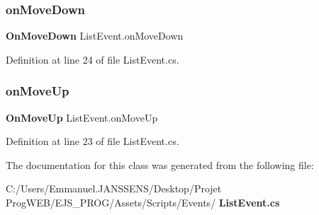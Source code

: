 \subsubsection{on\+Move\+Down}
{\footnotesize\ttfamily \textbf{ On\+Move\+Down} List\+Event.\+on\+Move\+Down}



Definition at line 24 of file List\+Event.\+cs.

\mbox{\label{class_list_event_aedaeeac65ee588420ff2f459dd86e023}} 
\subsubsection{on\+Move\+Up}
{\footnotesize\ttfamily \textbf{ On\+Move\+Up} List\+Event.\+on\+Move\+Up}



Definition at line 23 of file List\+Event.\+cs.



The documentation for this class was generated from the following file\+:\begin{DoxyCompactItemize}
\item 
C\+:/\+Users/\+Emmanuel.\+J\+A\+N\+S\+S\+E\+N\+S/\+Desktop/\+Projet Prog\+W\+E\+B/\+E\+J\+S\+\_\+\+P\+R\+O\+G/\+Assets/\+Scripts/\+Events/\textbf{ List\+Event.\+cs}\end{DoxyCompactItemize}
